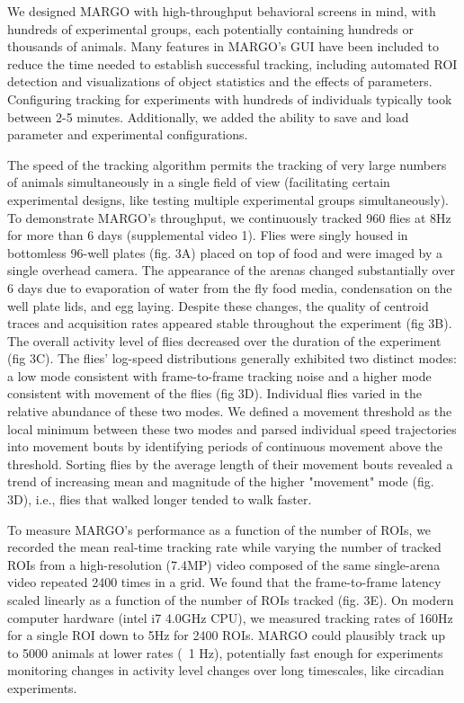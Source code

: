 \documentclass[10pt]{article}
\begin{document}
\begin{multicols}{2}
We designed MARGO with high-throughput behavioral screens in mind, with hundreds of experimental groups, each potentially containing hundreds or thousands of animals. Many features in MARGO's GUI have been included to reduce the time needed to establish successful tracking, including automated ROI detection and visualizations of object statistics and the effects of parameters. Configuring tracking for experiments with hundreds of individuals typically took between 2-5 minutes. Additionally, we added the ability to save and load parameter and experimental configurations.

The speed of the tracking algorithm permits the tracking of very large numbers of animals simultaneously in a single field of view (facilitating certain experimental designs, like testing multiple experimental groups simultaneously). To demonstrate MARGO's throughput, we continuously tracked 960 flies at 8Hz for more than 6 days (supplemental video 1). Flies were singly housed in bottomless 96-well plates (fig. 3A) placed on top of food and were imaged by a single overhead camera. The appearance of the arenas changed substantially over 6 days due to evaporation of water from the fly food media, condensation on the well plate lids, and egg laying. Despite these changes, the quality of centroid traces and acquisition rates appeared stable throughout the experiment (fig 3B). The overall activity level of flies decreased over the duration of the experiment (fig 3C). The flies' log-speed distributions generally exhibited two distinct modes: a low mode consistent with frame-to-frame tracking noise and a higher mode consistent with movement of the flies (fig 3D)\citep{berman_choi_bialek_shaevitz_2014,Crall_2016_cockroach}. Individual flies varied in the relative abundance of these two modes. We defined a movement threshold as the local minimum between these two modes and parsed individual speed trajectories into movement bouts by identifying periods of continuous movement above the threshold. Sorting flies by the average length of their movement bouts revealed a trend of increasing mean and magnitude of the higher "movement" mode (fig. 3D), i.e., flies that walked longer tended to walk faster.

To measure MARGO's performance as a function of the number of ROIs, we recorded the mean real-time tracking rate while varying the number of tracked ROIs from a high-resolution (7.4MP) video composed of the same single-arena video repeated 2400 times in a grid. We found that the frame-to-frame latency scaled linearly as a function of the number of ROIs tracked (fig. 3E). On modern computer hardware (intel i7 4.0GHz CPU), we measured tracking rates of 160Hz for a single ROI down to 5Hz for 2400 ROIs. MARGO could plausibly track up to 5000 animals at lower rates (~1 Hz), potentially fast enough for experiments monitoring changes in activity level changes over long timescales, like circadian experiments.


\end{multicols}
\end{document}
